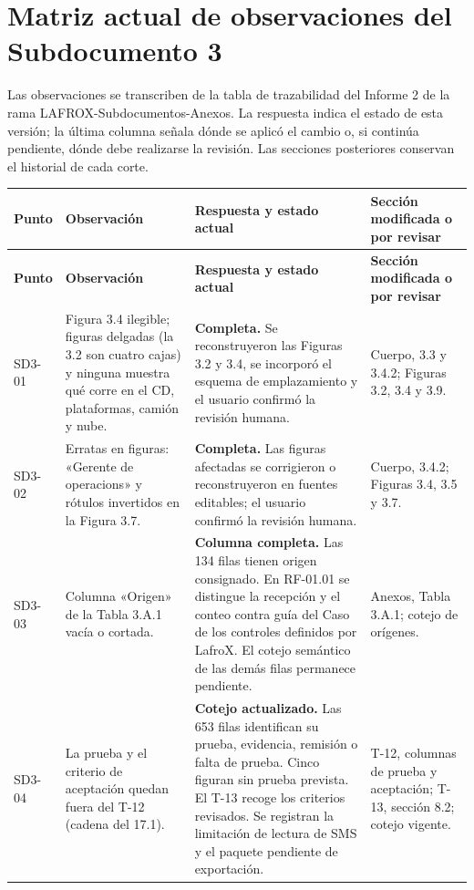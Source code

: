 \section*{Matriz actual de observaciones del Subdocumento 3}

Las observaciones se transcriben de la tabla de trazabilidad del Informe 2 de la rama LAFROX-Subdocumentos-Anexos. La respuesta indica el estado de esta versión; la última columna señala dónde se aplicó el cambio o, si continúa pendiente, dónde debe realizarse la revisión. Las secciones posteriores conservan el historial de cada corte.

\begin{longtable}{@{}P{0.10\textwidth}P{0.27\textwidth}P{0.36\textwidth}P{\tabcolsep\relax}@{}}
\hline
\textbf{Punto} & \textbf{Observación} & \textbf{Respuesta y estado actual} & \textbf{Sección modificada o por revisar} \\
\hline
\endfirsthead
\hline
\textbf{Punto} & \textbf{Observación} & \textbf{Respuesta y estado actual} & \textbf{Sección modificada o por revisar} \\
\hline
\endhead
\hline
\endfoot
SD3-01 & Figura 3.4 ilegible; figuras delgadas (la 3.2 son cuatro cajas) y ninguna muestra qué corre en el CD, plataformas, camión y nube. & \textbf{Completa.} Se reconstruyeron las Figuras 3.2 y 3.4, se incorporó el esquema de emplazamiento y el usuario confirmó la revisión humana. & Cuerpo, 3.3 y 3.4.2; Figuras 3.2, 3.4 y 3.9. \\
SD3-02 & Erratas en figuras: «Gerente de operacions» y rótulos invertidos en la Figura 3.7. & \textbf{Completa.} Las figuras afectadas se corrigieron o reconstruyeron en fuentes editables; el usuario confirmó la revisión humana. & Cuerpo, 3.4.2; Figuras 3.4, 3.5 y 3.7. \\
SD3-03 & Columna «Origen» de la Tabla 3.A.1 vacía o cortada. & \textbf{Columna completa.} Las 134 filas tienen origen consignado. En RF-01.01 se distingue la recepción y el conteo contra guía del Caso de los controles definidos por LafroX. El cotejo semántico de las demás filas permanece pendiente. & Anexos, Tabla 3.A.1; cotejo de orígenes. \\
SD3-04 & La prueba y el criterio de aceptación quedan fuera del T-12 (cadena del 17.1). & \textbf{Cotejo actualizado.} Las 653 filas identifican su prueba, evidencia, remisión o falta de prueba. Cinco figuran sin prueba prevista. El T-13 recoge los criterios revisados. Se registran la limitación de lectura de SMS y el paquete pendiente de exportación. & T-12, columnas de prueba y aceptación; T-13, sección 8.2; cotejo vigente. \\

\end{longtable}

